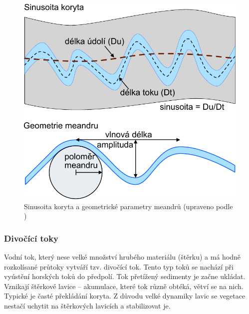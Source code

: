 \begin{figure}
	\centering
	\includegraphics[width=1\linewidth]{obrazky/fluvial/mendry_sinusoita}
	\caption{Sinusoita koryta a geometrické parametry meandrů (upraveno podle \textcite{biermanKeyConceptsGeomorphology2014})}
	\label{fig:mendrysinusoita}
\end{figure}

\subsubsection{Divočící toky}
Vodní tok, který nese velké množství hrubého materiálu (štěrku) a má hodně rozkolísané průtoky vytváří tzv. divočící tok. Tento typ toků se nachází při vyústění horských toků do předpolí. Tok přetížený sedimenty je začne ukládat. Vznikají štěrkové lavice -- akumulace, které tok různě obtéká, větví se na nich. Typické je časté překládání koryta. Z důvodu velké dynamiky lavic se vegetace nestačí uchytit na štěrkových lavicích a stabilizovat je.

